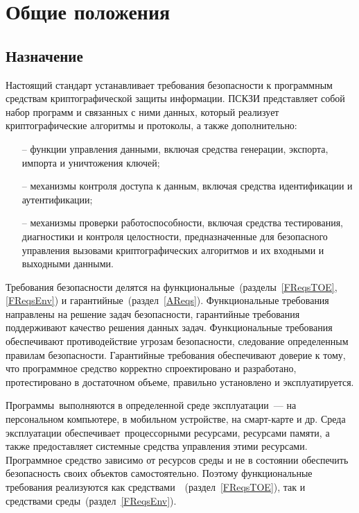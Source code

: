 \chapter{Общие положения}\label{Common}

\section{Назначение}

Настоящий стандарт устанавливает требования безопасности к программным 
средствам криптографической защиты информации.
ПСКЗИ представляет собой набор программ и связанных с ними данных,
который реализует криптографические алгоритмы и протоколы,
а также дополнительно:
\begin{itemize}
\item[--]
функции управления данными,
включая средства генерации, экспорта, импорта и уничтожения
ключей;

\item[--]
механизмы контроля доступа к данным,
включая средства идентификации и аутентификации;

\item[--]
механизмы проверки работоспособности,
включая средства тестирования, диагностики и 
контроля целостности,
%
предназначенные для безопасного управления вызовами
криптографических алгоритмов и их входными и выходными данными.
\end{itemize}

Требования безопасности делятся на 
функциональные~(разделы~\ref{FReqsTOE}, \ref{FReqsEnv}) 
и гарантийные~(раздел~\ref{AReqs}).
Функциональные требования направлены на решение задач безопасности,
гарантийные требования поддерживают качество решения данных задач.
%
Функциональные требования обеспечивают противодействие угрозам безопасности, 
следование определенным правилам безопасности.
%
Гарантийные требования обеспечивают доверие к тому, 
что программное средство корректно спроектировано и разработано, 
протестировано в достаточном объеме, 
правильно установлено и эксплуатируется.

Программы~\TOE выполняются в определенной среде эксплуатации~---
на персональном компьютере, в мобильном устройстве, на смарт-карте и др.
Среда эксплуатации обеспечивает~\TOE процессорными ресурсами, 
ресурсами памяти, а также предоставляет системные средства 
управления этими ресурсами.
%
Программное средство зависимо от ресурсов среды 
и не в состоянии обеспечить безопасность своих объектов самостоятельно.
Поэтому функциональные требования реализуются
как средствами~\TOE~(раздел~\ref{FReqsTOE}),
так и средствами среды~(раздел~\ref{FReqsEnv}).

